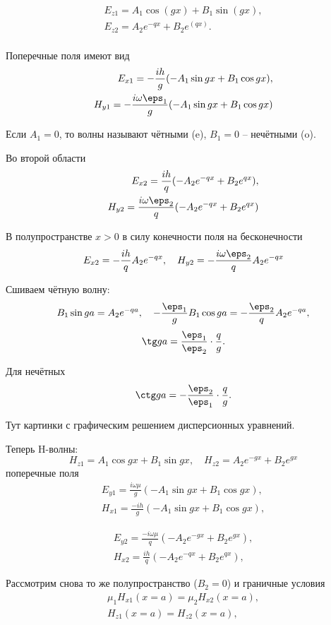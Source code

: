 \begin{align*}
	E_{z1} = A_1\cos(gx) + B_1\sin(gx),\\
	E_{z2} = A_2 e^{-qx} + B_2 e^(qx).\\
\end{align*}

Поперечные поля имеют вид
\begin{align*}
	E_{x1} = -\frac{ih}{g}(-A_1\sin gx + B_1\cos gx),\\
	H_{y1} = -\frac{i\omega\eps_1}{g}(-A_1\sin gx + B_1\cos gx)\\
\end{align*}

Если \(A_1 = 0\), то волны называют чётными (e), \( B_1 = 0 \) -- нечётными (o).

Во второй области
\begin{align*}
	E_{x2} = \frac{ih}{q}(-A_2 e^{-qx} + B_2 e^{qx}),\\
	H_{y2} = \frac{i\omega\eps_2}{q}(-A_2 e^{-qx} + B_2 e^{qx})\\
\end{align*}

В полупространстве \( x>0 \) в силу конечности поля на бесконечности
\[
	E_{x2} = -\frac{ih}{q} A_2 e^{-qx},\quad
	H_{y2} = -\frac{i\omega\eps_2}{q} A_2 e^{-qx}
\]

Сшиваем чётную волну:
\[
	B_1\sin ga = A_2e^{-qa},\quad -\frac{\eps_1}{g} B_1\cos ga = -\frac{\eps_2}{q} A_2 e^{-qa},
\]
\[
	\tg ga = \frac{\eps_1}{\eps_2}\cdot\frac{q}{g}.
\]

Для нечётных
\[
	\ctg ga = -\frac{\eps_2}{\eps_1}\cdot\frac{q}{g}.
\]

Тут картинки с графическим решением дисперсионных уравнений.

Теперь H-волны:
\[
	H_{z1} = A_1 \cos gx + B_1 \sin gx,\quad H_{z2} = A_2 e^{-gx} + B_2 e^{gx}
\]
поперечные поля
\begin{align*}
	E_{y1} = \frac{i\omega\mu}{g}(-A_1\sin gx + B_1\cos gx),\\
	H_{x1} = \frac{-ih}{g}(-A_1\sin gx + B_1\cos gx),
\end{align*}

\begin{align*}
	E_{y2} = \frac{-i\omega\mu}{q}(-A_2 e^{-gx} + B_2 e^{gx}),\\
	H_{x2} = \frac{ih}{q}(-A_2 e^{-qx} + B_2 e^{qx}),
\end{align*}

Рассмотрим снова то же полупространство (\( B_2 = 0 \)) и граничные условия
\begin{align*}
	\mu_1H_{x1}(x=a) = \mu_2H_{x2}(x=a),\\
	H_{z1}(x=a) = H_{z2}(x=a),\\
\end{align*}


